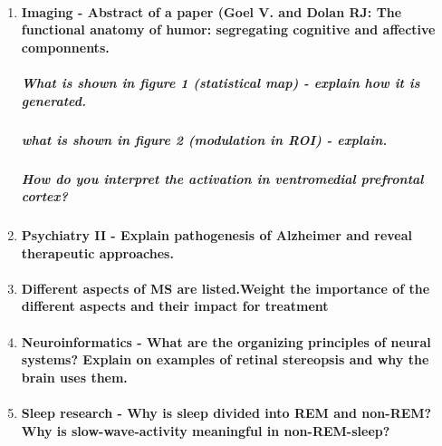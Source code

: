 \documentclass[12pt,article,oneside,a4paper]{memoir}
\begin{document}
\begin{enumerate}
\item \paragraph{Imaging - Abstract of a paper (Goel V. and Dolan RJ: The functional anatomy of humor: segregating cognitive and affective componnents.}
\subparagraph{What is shown in figure 1 (statistical map) - explain how it is generated.}
\subparagraph{what is shown in figure 2 (modulation in ROI) - explain.}
\subparagraph{How do you interpret the activation in ventromedial prefrontal cortex?}
\item \paragraph{Psychiatry II - Explain pathogenesis of Alzheimer and reveal therapeutic approaches.}
\item \paragraph{Different aspects of MS are listed.Weight the importance of the different aspects and their impact for treatment}
\item \paragraph{Neuroinformatics - What are the organizing principles of neural systems? Explain on examples of retinal stereopsis and why the brain uses them.}
\item \paragraph{Sleep research - Why is sleep divided into REM and non-REM? Why is slow-wave-activity meaningful in non-REM-sleep?}
\end{enumerate}
\end{document}
